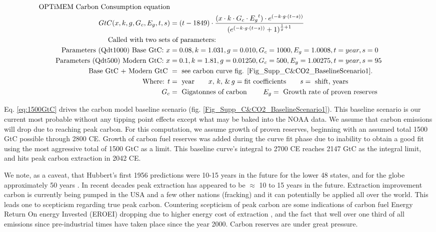 \documentclass{article}
\begin{document}
\begin{align}
    \begin{aligned} \label{eq:1500GtC}
 \text{OPTiMEM Carbon Consumption equation}   \\ 
 GtC(x, k, g, G_c, E_g, t, s)  &= (t-1849) \cdot \frac{(x \cdot k \cdot G_c \cdot {E_g}^t)\cdot e^{(-k \cdot g \cdot (t-s))}}{(e^{(-k \cdot g \cdot (t-s))}+1)^{\frac{1}{g} +1}} \\
\text{ Called with two sets} & \text{ of parameters: } \\
\text{Parameters (Qdt1000) Base GtC: } x&= 0.08, k=1.031, g=0.010, G_c=1000, E_g=1.0008, t= year, s=0 \qquad \\
\text{Parameters (Qdt500) Modern GtC: } x&= 0.1, k=1.81, g=0.01250, G_c=500, E_g=1.00275, t= year, s=95\\
\text{Base GtC + Modern GtC }&= \text{ see carbon curve fig. \ref{Fig_Supp_C&CO2_BaselineScenario1}. }\\
\text{Where: } t &= \text{ year}  \qquad 
  x, \, k, \, \& \, g  = \text{fit coefficients} \qquad 
  s = \text{ shift, years} \\
 G_c &= \text{ Gigatonnes of carbon } \qquad
 E_g = \text{ Growth rate of proven reserves }  \\
    \end{aligned}   
\end{align}


Eq. \ref{eq:1500GtC} drives the carbon model baseline scenario (fig. \ref{Fig_Supp_C&CO2_BaselineScenario1}). This baseline scenario is our current most probable without any tipping point effects except what may be baked into the NOAA data. We assume that carbon emissions will drop due to reaching peak carbon. For this computation, we assume growth of proven reserves, beginning with an assumed total 1500 GtC \cite{Tans2009_OceanicandAtmosCO2} possible through 2800 CE. Growth of carbon fuel reserves was added during the curve fit phase due to inability to obtain a good fit using the most aggressive total of 1500 GtC as a limit. This baseline curve's integral to 2700 CE reaches 2147 GtC as the integral limit, and hits peak carbon extraction in 2042 CE. 

We note, as a caveat, that Hubbert's first 1956 predictions were 10-15 years in the future for the lower 48 states, and for the globe approximately 50 years \cite{Hubbert1956NuclearAndFossilFuels}. In recent decades peak extraction has appeared to be $\approx$ 10 to 15 years in the future.  Extraction improvement carbon is currently being pumped in the USA and a few other nations (fracking) and it can potentially be applied all over the world. This leads one to scepticism regarding true peak carbon. Countering scepticism of peak carbon are some indications of carbon fuel Energy Return On energy Invested (EROEI) dropping due to higher energy cost of extraction \cite{Tverberg2021HubbertLimit,Tverberg2021FossilFuelProblem}, and the fact that well over one third of all emissions since pre-industrial times have taken place since the year 2000. Carbon reserves are under great pressure. 
\end{document}
